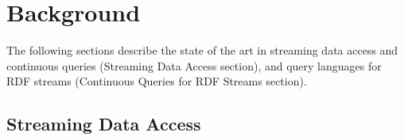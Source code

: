 \section{Background}\label{previousworks}


The following sections describe the state of the art in streaming data access and continuous queries (Streaming Data Access section), %
 and query languages for RDF streams (Continuous Queries for RDF Streams section). %



\subsection{Streaming Data Access}
\label{datastreams}



